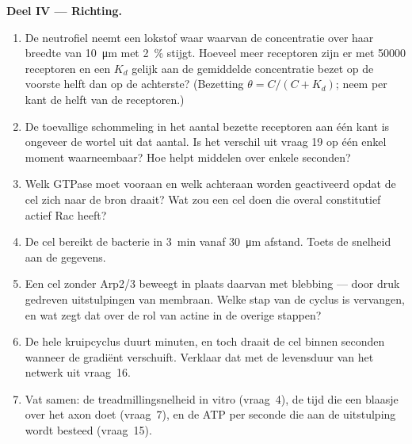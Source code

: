 \begin{problem}
\medskip
\noindent\textbf{Deel IV --- Richting.}
\begin{enumerate}[resume]
  \item De neutrofiel neemt een lokstof waar waarvan de concentratie
        over haar breedte van \qty{10}{\micro m} met \qty{2}{\%} stijgt.
        Hoeveel meer receptoren zijn er met \num{50000} receptoren en
        een $K_{d}$ gelijk aan de gemiddelde concentratie bezet op de
        voorste helft dan op de achterste? (Bezetting $\theta = C/(C +
        K_{d})$; neem per kant de helft van de receptoren.)
  \item De toevallige schommeling in het aantal bezette receptoren aan
        één kant is ongeveer de wortel uit dat aantal. Is het verschil
        uit vraag 19 op één enkel moment waarneembaar? Hoe helpt
        middelen over enkele seconden?
  \item Welk GTPase moet vooraan en welk achteraan worden geactiveerd
        opdat de cel zich naar de bron draait? Wat zou een cel doen die
        overal constitutief actief Rac heeft?
  \item De cel bereikt de bacterie in \qty{3}{min} vanaf
        \qty{30}{\micro m} afstand. Toets de snelheid aan de gegevens.
  \item Een cel zonder Arp2/3 beweegt in plaats daarvan met blebbing
        --- door druk gedreven uitstulpingen van membraan. Welke stap
        van de cyclus is vervangen, en wat zegt dat over de rol van
        actine in de overige stappen?
  \item De hele kruipcyclus duurt minuten, en toch draait de cel binnen
        seconden wanneer de gradiënt verschuift. Verklaar dat met de
        levensduur van het netwerk uit vraag~16.
  \item Vat samen: de treadmillingsnelheid in vitro (vraag~4), de tijd
        die een blaasje over het axon doet (vraag~7), en de ATP per
        seconde die aan de uitstulping wordt besteed (vraag~15).
\end{enumerate}
\end{problem}
